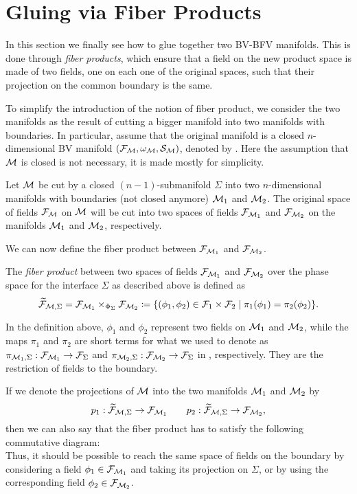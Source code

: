 \section{Gluing via Fiber Products}
\label{sec:gluing_fiber_prod}

In this section we finally see how to glue together two BV-BFV manifolds.
This is done through \emph{fiber products}, which ensure that a field on the new product space is made of two fields, one on each one of the original spaces, such that their projection on the common boundary is the same.

To simplify the introduction of the notion of fiber product, we consider the two manifolds as the result of cutting a bigger manifold into two manifolds with boundaries.
In particular, assume that the original manifold is a closed $n$-dimensional BV manifold $(\mathcal{F}_{\mathcal{M}}, \omega_{\mathcal{M}}, \mathcal{S}_{\mathcal{M}})$, denoted by \M.
Here the assumption that $\mathcal{M}$ is closed is not necessary, it is made mostly for simplicity.

Let $\mathcal{M}$ be cut by a closed $(n-1)$-submanifold $\Sigma$ into two $n$-dimensional manifolds with boundaries (not closed anymore) $\mathcal{M}_1$ and $\mathcal{M}_2$.
The original space of fields $\mathcal{F}_{\mathcal{M}}$ on $\mathcal{M}$ will be cut into two spaces of fields $\mathcal{F}_{\mathcal{M}_1}$ and $\mathcal{F}_{\mathcal{M}_2}$ on the manifolds $\mathcal{M}_1$ and $\mathcal{M}_2$, respectively.

We can now define the fiber product between $\mathcal{F}_{\mathcal{M}_1}$ and $\mathcal{F}_{\mathcal{M}_2}$.

\begin{definition}
    The \emph{fiber product} between two spaces of fields $\mathcal{F}_{\mathcal{M}_1}$ and $\mathcal{F}_{\mathcal{M}_2}$ over the phase space for the interface $\Sigma$ as described above is defined as
    \begin{equation}
    \label{eq:fiber_prod}
        \widetilde{\mathcal{F}}_{\mathcal{M}, \Sigma} = \mathcal{F}_{\mathcal{M}_1} \times_{\Phi_\Sigma} \mathcal{F}_{\mathcal{M}_2} 
        \coloneqq \{(\phi_1, \phi_2) \in \mathcal{F}_1 \times \mathcal{F}_2 \; | \;
        \pi_1(\phi_1) = \pi_2(\phi_2) \} .
    \end{equation}
\end{definition}

In the definition above, $\phi_1$ and $\phi_2$ represent two fields on $\mathcal{M}_1$ and $\mathcal{M}_2$, while the maps $\pi_1$ and $\pi_2$ are short terms for what we used to denote as $\pi_{\mathcal{M}_1, \Sigma}: \mathcal{F}_{\mathcal{M}_1} \rightarrow \mathcal{F}_\Sigma$ and $\pi_{\mathcal{M}_2, \Sigma}: \mathcal{F}_{\mathcal{M}_2} \rightarrow \mathcal{F}_\Sigma$ in , respectively.
They are the restriction of fields to the boundary.

If we denote the projections of $\mathcal{M}$ into the two manifolds $\mathcal{M}_1$ and $\mathcal{M}_2$ by
\begin{equation*}
    p_1: \widetilde{\mathcal{F}}_{\mathcal{M}, \Sigma} \rightarrow \mathcal{F}_{\mathcal{M}_1} 
    \qquad
    p_2: \widetilde{\mathcal{F}}_{\mathcal{M}, \Sigma} \rightarrow \mathcal{F}_{\mathcal{M}_2},
\end{equation*}
then we can also say that the fiber product has to satisfy the following commutative diagram:
\begin{equation*}
    
\end{equation*}
Thus, it should be possible to reach the same space of fields on the boundary by considering a field $\phi_1 \in \mathcal{F}_{\mathcal{M}_1}$ and taking its projection on $\Sigma$, or by using the corresponding field $\phi_2 \in \mathcal{F}_{\mathcal{M}_2}$.

